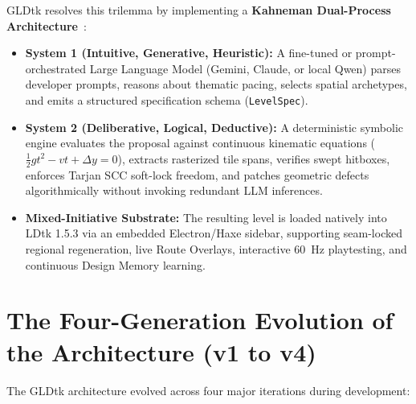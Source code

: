 \documentclass[11pt,a4paper]{report}
\theoremstyle{definition}
\theoremstyle{remark}
\begin{document}
GLDtk resolves this trilemma by implementing a \textbf{Kahneman Dual-Process Architecture}~\citep{kahneman2011thinking, garcez2023neurosymbolic}:
\begin{itemize}
    \item \textbf{System 1 (Intuitive, Generative, Heuristic):} A fine-tuned or prompt-orchestrated Large Language Model (Gemini, Claude, or local Qwen) parses developer prompts, reasons about thematic pacing, selects spatial archetypes, and emits a structured specification schema (\texttt{LevelSpec}).
    \item \textbf{System 2 (Deliberative, Logical, Deductive):} A deterministic symbolic engine evaluates the proposal against continuous kinematic equations ($\frac{1}{2}gt^2 - vt + \Delta y = 0$), extracts rasterized tile spans, verifies swept hitboxes, enforces Tarjan SCC soft-lock freedom, and patches geometric defects algorithmically without invoking redundant LLM inferences.
    \item \textbf{Mixed-Initiative Substrate:} The resulting level is loaded natively into LDtk 1.5.3 via an embedded Electron/Haxe sidebar, supporting seam-locked regional regeneration, live Route Overlays, interactive 60~Hz playtesting, and continuous Design Memory learning.
\end{itemize}

\section{The Four-Generation Evolution of the Architecture (v1 to v4)}
The GLDtk architecture evolved across four major iterations during development:
\end{document}
